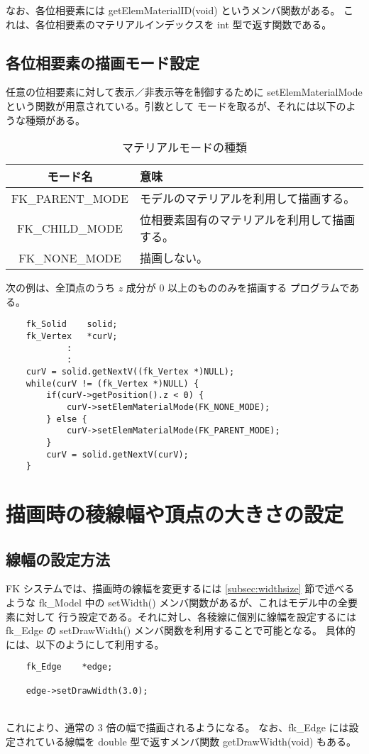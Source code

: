 なお、各位相要素には getElemMaterialID(void) というメンバ関数がある。
これは、各位相要素のマテリアルインデックスを int 型で返す関数である。

\subsection{各位相要素の描画モード設定}	\label{subsubsec:matmode}
任意の位相要素に対して表示／非表示等を制御するために
setElemMaterialMode という関数が用意されている。引数として
モードを取るが、それには以下のような種類がある。

\begin{table}[H]
\caption{マテリアルモードの種類}
\label{tbl:mate1}
\begin{center}
\begin{tabular}{|c|l|}
\hline
モード名 & 意味 \\ \hline \hline
FK\_PARENT\_MODE & モデルのマテリアルを利用して描画する。\\ \hline
FK\_CHILD\_MODE & 位相要素固有のマテリアルを利用して描画する。\\ \hline
FK\_NONE\_MODE & 描画しない。\\ \hline
\end{tabular}
\end{center}
\end{table}
次の例は、全頂点のうち \(z\) 成分が 0 以上のもののみを描画する
プログラムである。
\\
\begin{breakbox}
\begin{verbatim}
    fk_Solid    solid;
    fk_Vertex   *curV;
            :
            :
    curV = solid.getNextV((fk_Vertex *)NULL);
    while(curV != (fk_Vertex *)NULL) {
        if(curV->getPosition().z < 0) {
            curV->setElemMaterialMode(FK_NONE_MODE);
        } else {
            curV->setElemMaterialMode(FK_PARENT_MODE);
        }
        curV = solid.getNextV(curV);
    }
\end{verbatim}
\end{breakbox}
\section{描画時の稜線幅や頂点の大きさの設定}
\subsection{線幅の設定方法}
FK システムでは、描画時の線幅を変更するには
\ref{subsec:widthsize} 節で述べるような fk\_Model 中の
setWidth() メンバ関数があるが、これはモデル中の全要素に対して
行う設定である。それに対し、各稜線に個別に線幅を設定するには
fk\_Edge の setDrawWidth() メンバ関数を利用することで可能となる。
具体的には、以下のようにして利用する。
\\
\begin{screen}
\begin{verbatim}
    fk_Edge    *edge;

    edge->setDrawWidth(3.0);
\end{verbatim}
\end{screen}
~ \\
これにより、通常の 3 倍の幅で描画されるようになる。
なお、fk\_Edge には設定されている線幅を double 型で返すメンバ関数
getDrawWidth(void) もある。
